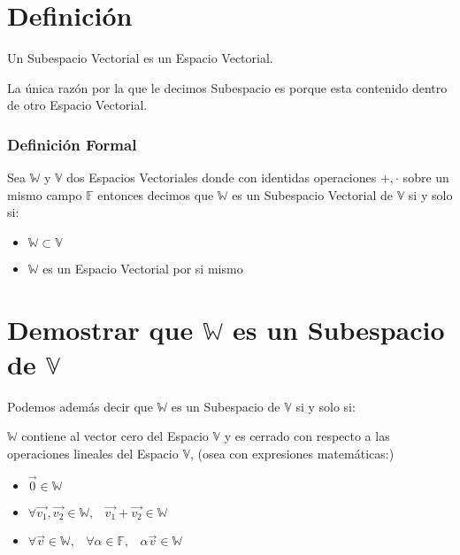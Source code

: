\documentclass[12pt, fleqn]{report}                             %
\DeclareMathOperator \Space {\quad}                             %
\DeclareMathOperator \MiniSpace {\;}                            %
\begin{document}
        \clearpage
        \section{Definición}

            Un Subespacio Vectorial es un Espacio Vectorial.

            La única razón por la que le decimos Subespacio es porque esta contenido dentro de
            otro Espacio Vectorial.

            \subsubsection*{Definición Formal}
                Sea $\mathbb{W}$ y $\mathbb{V}$ dos Espacios Vectoriales donde con identidas
                operaciones $+, \cdot$ sobre un mismo campo $\mathbb{F}$ entonces decimos
                que $\mathbb{W}$ es un Subespacio Vectorial de $\mathbb{V}$ si y solo si:

                \begin{itemize}
                    \item $\mathbb{W} \subset \mathbb{V}$
                    \item $\mathbb{W}$ es un Espacio Vectorial por si mismo
                \end{itemize}


        \section{Demostrar que $\mathbb{W}$ es un Subespacio de $\mathbb{V}$}

            Podemos además decir que $\mathbb{W}$ es un Subespacio de $\mathbb{V}$
            si y solo si:

            $\mathbb{W}$ contiene al vector cero del Espacio $\mathbb{V}$ y es cerrado
            con respecto a las operaciones lineales del Espacio $\mathbb{V}$, (osea con
            expresiones matemáticas:)

            \begin{itemize}
                \item $\vec{0} \in \mathbb{W}$
                
                \item $\forall \vec{v_1}, \vec{v_2} \in \mathbb{W}, \MiniSpace
                            \vec{v_1} + \vec{v_2} \in \mathbb{W}$

                \item $\forall \vec{v} \in \mathbb{W}, \MiniSpace
                            \forall \alpha \in \mathbb{F}, \MiniSpace
                                \alpha \vec{v} \in \mathbb{W}$
             \end{itemize}
\end{document}
